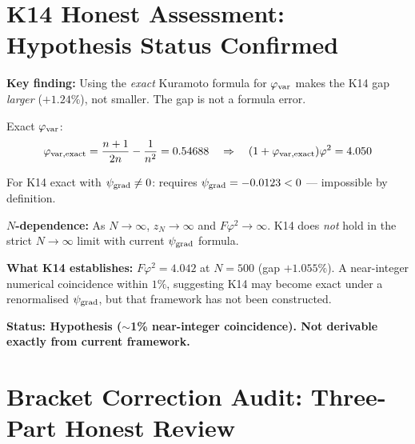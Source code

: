 \documentclass[12pt, a4paper]{article}
\begin{document}
\section{K14 Honest Assessment: Hypothesis Status Confirmed}

\begin{openqbox}[title={K14: $F\varphi^2 = 4$ --- Hypothesis, Not Derivable Exactly (CRF\_K14\_Assessment)}]
\textbf{Key finding:} Using the \emph{exact} Kuramoto formula for $\varphi_{\rm var}$ makes the K14 gap \emph{larger} ($+1.24\%$), not smaller. The gap is not a formula error.

Exact $\varphi_{\rm var}$:
\[
  \varphi_{\rm var,\rm exact} = \frac{n+1}{2n} - \frac{1}{n^2} = 0.54688
  \quad\Rightarrow\quad (1+\varphi_{\rm var,\rm exact})\varphi^2 = 4.050
\]

For K14 exact with $\psi_{\rm grad}\neq 0$: requires $\psi_{\rm grad} = -0.0123 < 0$ --- impossible by definition.

\textbf{$N$-dependence:} As $N\to\infty$, $z_N\to\infty$ and $F\varphi^2\to\infty$. K14 does \emph{not} hold in the strict $N\to\infty$ limit with current $\psi_{\rm grad}$ formula.

\textbf{What K14 establishes:} $F\varphi^2 = 4.042$ at $N=500$ (gap $+1.055\%$). A near-integer numerical coincidence within $1\%$, suggesting K14 may become exact under a renormalised $\psi_{\rm grad}$, but that framework has not been constructed.

\textbf{Status: Hypothesis ($\sim$1\% near-integer coincidence). Not derivable exactly from current framework.}
\end{openqbox}

\section{Bracket Correction Audit: Three-Part Honest Review}
\end{document}
